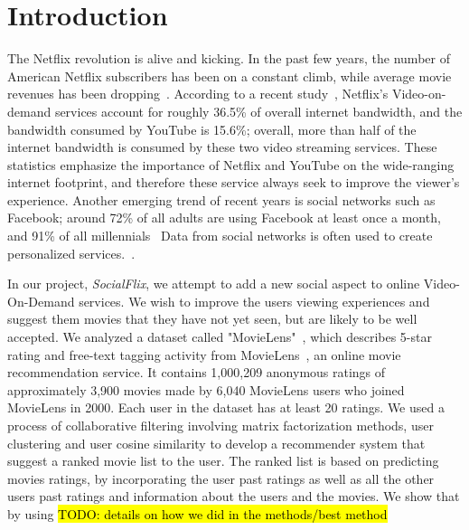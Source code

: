 \section{Introduction}
\label{sec:intro}

The Netflix revolution is alive and kicking. 
In the past few years, the number of American Netflix subscribers has been on a constant climb, while average movie revenues has been dropping~\cite{MisixNetflix}.
According to a recent study~\cite{VarietyNetflixBandwidth}, Netflix's Video-on-demand services account for roughly 36.5\% of overall internet bandwidth, and the bandwidth consumed by YouTube is 15.6\%; overall, more than half of the internet bandwidth is consumed by these two video streaming services.
These statistics emphasize the importance of Netflix and YouTube on the wide-ranging internet footprint, and therefore these service always seek to improve the viewer's experience.
Another emerging trend of recent years is social networks such as Facebook; around 72\% of all adults are using Facebook at least once a month, and 91\% of all millennials~\cite{FacebookStats} Data from social networks is often used to create personalized services.~\cite{carmel2009personalized}.


In our project, \textit{SocialFlix}, we attempt to add a new social aspect to online Video-On-Demand services. We wish to improve the users viewing experiences and suggest them movies that they have not yet seen, but are likely to be well accepted. We analyzed a dataset called "MovieLens"~\cite{GroupLens}, which describes 5-star rating and free-text tagging activity from MovieLens~\cite{MovieLens}, an online movie recommendation service. It contains 1,000,209 anonymous ratings of approximately 3,900 movies made by 6,040 MovieLens users who joined MovieLens in 2000. Each user in the dataset has at least 20 ratings. We used a process of collaborative filtering involving matrix factorization methods, user clustering and user cosine similarity to develop a recommender system that suggest a ranked movie list to the user. The ranked list is based on predicting movies ratings, by incorporating the user past ratings as well as all the other users past ratings and information about the users and the movies. We show that by using \hl{TODO: details on how we did in the methods/best method}

